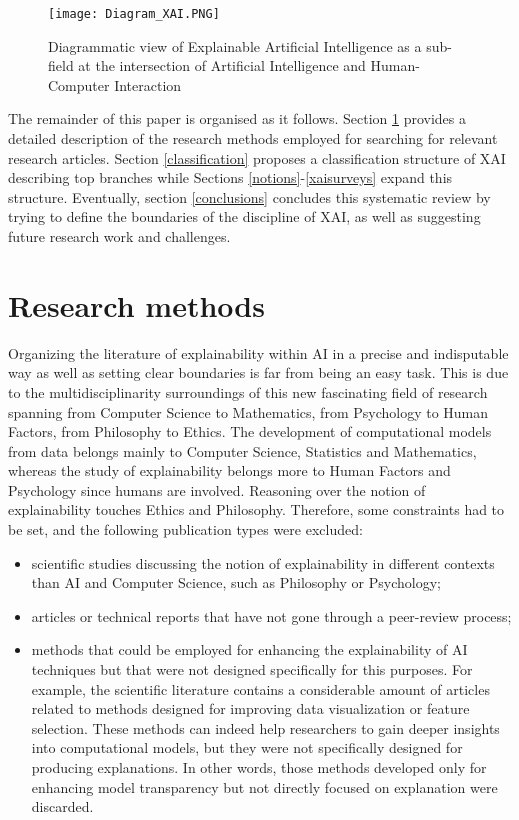 \documentclass[final,1p,times]{elsarticle}
\begin{document}
\begin{figure}[htbp]
    \centering
    \texttt{[image: Diagram\_XAI.PNG]}
    \caption{Diagrammatic view of Explainable Artificial Intelligence as a sub-field at the intersection of  Artificial Intelligence and Human-Computer Interaction}
    \label{fig:XAI}
\end{figure}


The remainder of this paper is organised as it follows. Section \ref{research_met} provides a detailed description of the research methods employed for searching for relevant research articles. Section \ref{classification} proposes a classification structure of XAI describing top branches while Sections \ref{notions}-\ref{xaisurveys} expand this structure. Eventually, section \ref{conclusions} concludes this systematic review by trying to define the boundaries of the discipline of XAI, as well as suggesting future research work and challenges.\\

\section{Research methods}\label{research_met}
Organizing the literature of explainability within AI in a precise and indisputable way as well as setting clear boundaries is far from being an easy task. This is due to the multidisciplinarity surroundings of this new fascinating field of research spanning from Computer Science to Mathematics, from Psychology to Human Factors, from Philosophy to Ethics. The development of computational models from data belongs mainly to Computer Science, Statistics and Mathematics, whereas the study of explainability belongs more to Human Factors and Psychology since humans are involved. Reasoning over the notion of explainability touches Ethics and Philosophy. Therefore, some constraints had to be set, and the following publication types were excluded:
\begin{itemize}
\item scientific studies discussing the notion of explainability in different contexts than AI and Computer Science, such as Philosophy or Psychology;
\item articles or technical reports that have not gone through a peer-review process;
\item methods that could be employed for enhancing the explainability of AI techniques but that were not designed specifically for this purposes. For example, the scientific literature contains a considerable amount of articles related to methods designed for improving data visualization or feature selection. These methods can indeed help researchers to gain deeper insights into computational models, but they were not specifically designed for producing explanations. In other words, those methods developed only for enhancing model transparency but not directly focused on explanation were discarded.
\end{itemize}
\end{document}
